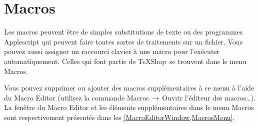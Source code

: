 \documentclass[11pt,french]{article}
\newcommand{\TS}{\textsf{\TeX Shop}}
\newcommand{\mnu}[1]{\textsf{#1}}
\newcommand{\To}{\,\(\to\)\,}
\begin{document}





\section{Macros}

Les macros peuvent être de simples substitutions de texte ou des programmes Applescript qui peuvent faire toutes sortes de traitements sur un fichier. Vous pouvez aussi assigner un raccourci clavier à une macro pour l'exécuter automatiquement. Celles qui font partie de \TS\ se trouvent dans le menu \mnu{Macros}.

Vous pouvez supprimer ou ajouter des macros supplémentaires à ce menu à l'aide du \mnu{Macro Editor} (utilisez la commande \mnu{Macros}\To\mnu{Ouvrir l'éditeur des macros…}). La fenêtre du \mnu{Macro Editor} et les éléments supplémentaires dans le menu \mnu{Macros} sont respectivement présentés dans les \vref{MacroEditorWindow,MacrosMenu}.
\end{document}
